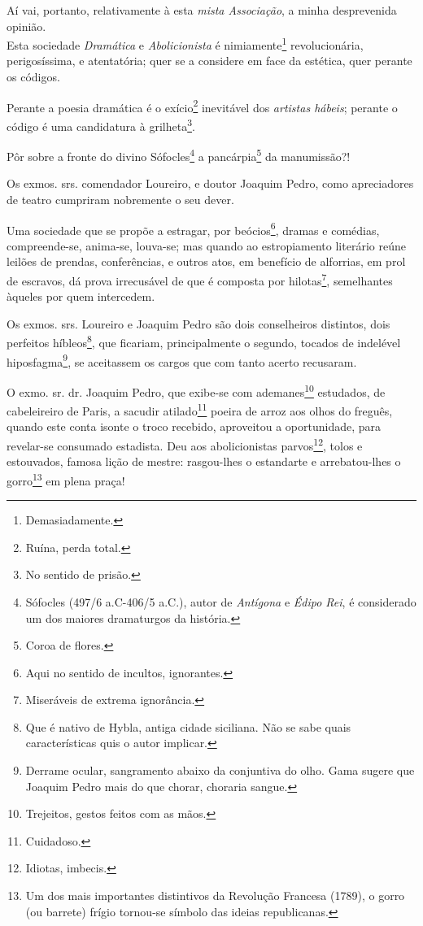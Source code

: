 Aí vai, portanto, relativamente à esta \emph{mista Associação}, a minha
desprevenida opinião.\\
Esta sociedade \emph{Dramática} e \emph{Abolicionista} é
nimiamente\footnote{Demasiadamente.} revolucionária, perigosíssima, e
atentatória; quer se a considere em face da estética, quer perante os
códigos.

Perante a poesia dramática é o exício\footnote{Ruína, perda total.}
inevitável dos \emph{artistas hábeis}; perante o código é uma
candidatura à grilheta\footnote{No sentido de prisão.}.

Pôr sobre a fronte do divino Sófocles\footnote{Sófocles (497/6
  a.C-406/5 a.C.), autor de \emph{Antígona} e \emph{Édipo Rei}, é
  considerado um dos maiores dramaturgos da história.} a
pancárpia\footnote{Coroa de flores.} da manumissão?!

Os exmos. srs. comendador Loureiro, e doutor Joaquim Pedro, como
apreciadores de teatro cumpriram nobremente o seu dever.

Uma sociedade que se propõe a estragar, por beócios\footnote{Aqui no
  sentido de incultos, ignorantes.}, dramas e comédias, compreende-se,
anima-se, louva-se; mas quando ao estropiamento literário reúne leilões
de prendas, conferências, e outros atos, em benefício de alforrias, em
prol de escravos, dá prova irrecusável de que é composta por
hilotas\footnote{Miseráveis de extrema ignorância.}, semelhantes
àqueles por quem intercedem.

Os exmos. srs. Loureiro e Joaquim Pedro são dois conselheiros distintos,
dois perfeitos híbleos\footnote{Que é nativo de Hybla, antiga cidade
  siciliana. Não se sabe quais características quis o autor implicar.},
que ficariam, principalmente o segundo, tocados de indelével
hiposfagma\footnote{Derrame ocular, sangramento abaixo da conjuntiva
  do olho. Gama sugere que Joaquim Pedro mais do que chorar, choraria
  sangue.}, se aceitassem os cargos que com tanto acerto recusaram.

O exmo. sr. dr. Joaquim Pedro, que exibe-se com ademanes\footnote{
  Trejeitos, gestos feitos com as mãos.} estudados, de cabeleireiro de
Paris, a sacudir atilado\footnote{Cuidadoso.} poeira de arroz aos
olhos do freguês, quando este conta isonte o troco recebido, aproveitou
a oportunidade, para revelar-se consumado estadista. Deu aos
abolicionistas parvos\footnote{Idiotas, imbecis.}, tolos e estouvados,
famosa lição de mestre: rasgou-lhes o estandarte e arrebatou-lhes o
gorro\footnote{Um dos mais importantes distintivos da Revolução
  Francesa (1789), o gorro (ou barrete) frígio tornou-se símbolo das
  ideias republicanas.} em plena praça!

